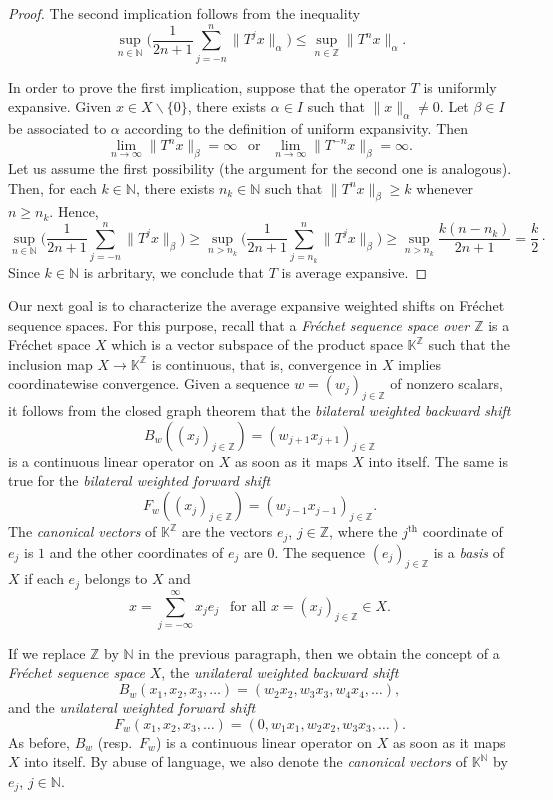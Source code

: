 \documentclass[12pt]{amsart}
\theoremstyle{theorem}
\theoremstyle{definition}
\theoremstyle{remark} \theoremstyle{question} \theoremstyle{example}
\newcommand{\N}{\mathbb{N}}   %
\newcommand{\Z}{\mathbb{Z}}   %
\newcommand{\K}{\mathbb{K}}   %
\begin{document}
\begin{proof}
The second implication follows from the inequality
\[
\sup_{n \in \N} \Big(\frac{1}{2n+1} \sum_{j=-n}^n \|T^j x\|_\alpha \Big) \leq \sup_{n \in \Z} \|T^nx\|_\alpha.
\]

In order to prove the first implication, suppose that the operator $T$ is uniformly expansive. 
Given $x \in X \backslash \{0\}$, there exists $\alpha \in I$ such that $\|x\|_\alpha \neq 0$.
Let $\beta \in I$ be associated to $\alpha$ according to the definition of uniform expansivity. Then
\[
\lim_{n \to \infty} \|T^n x\|_\beta = \infty \ \ \text{ or } \ \ \lim_{n \to \infty} \|T^{-n}x\|_\beta = \infty.
\]
Let us assume the first possibility (the argument for the second one is analogous). 
Then, for each $k \in \N$, there exists $n_k \in \N$ such that $\|T^n x\|_\beta \geq k$ whenever $n \geq n_k$. Hence,
\[
\sup_{n \in \N} \Big( \frac{1}{2n+1} \sum_{j=-n}^n \|T^j x\|_\beta \Big)
\geq \sup_{n > n_k} \Big(\frac{1}{2n+1} \sum_{j=n_k}^n \|T^j x\|_\beta \Big)
\geq \sup_{n > n_k} \frac{k(n-n_k)}{2n+1}
= \frac{k}{2}\cdot
\]
Since $k \in \N$ is arbritary, we conclude that $T$ is average expansive.
\end{proof}

Our next goal is to characterize the average expansive weighted shifts on Fr\'echet sequence spaces. For this purpose,
recall that a {\em Fr\'echet sequence space over $\Z$} is a Fr\'echet space $X$ which is a vector subspace of the product space 
$\K^\Z$ such that the inclusion map $X \to \K^\Z$ is continuous, that is, convergence in $X$ implies coordinatewise convergence.
Given a sequence $w = (w_j)_{j \in \Z}$ of nonzero scalars, it follows from the closed graph theorem that
the {\em bilateral weighted backward shift}
\[
B_w((x_j)_{j \in \Z}) = (w_{j+1}x_{j+1})_{j \in \Z}
\]
is a continuous linear operator on $X$ as soon as it maps $X$ into itself.
The same is true for the {\em bilateral weighted forward shift}
\[
F_w((x_j)_{j \in \Z}) = (w_{j-1}x_{j-1})_{j \in \Z}.
\]
The {\em canonical vectors} of $\K^\Z$ are the vectors $e_j$, $j \in \Z$, where the $j^\text{th}$ coordinate of $e_j$ is $1$
and the other coordinates of $e_j$ are $0$.
The sequence $(e_j)_{j \in \Z}$ is a {\em basis} of $X$ if each $e_j$ belongs to $X$ and
\[
x = \sum_{j=-\infty}^\infty x_j e_j \ \ \text{ for all } x = (x_j)_{j \in \Z} \in X.
\]

If we replace $\Z$ by $\N$ in the previous paragraph, then we obtain the concept of a {\em Fr\'echet sequence space} $X$,
the {\em unilateral weighted backward shift}
\[
B_w(x_1,x_2,x_3,\ldots) = (w_2x_2,w_3x_3,w_4x_4,\ldots),
\]
and the {\em unilateral weighted forward shift}
\[
F_w(x_1,x_2,x_3,\ldots) = (0,w_1x_1,w_2x_2,w_3x_3,\ldots).
\]
As before, $B_w$ (resp.\ $F_w$) is a continuous linear operator on $X$ as soon as it maps $X$ into itself.
By abuse of language, we also denote the {\em canonical vectors} of $\K^\N$ by $e_j$, $j \in \N$.
\end{document}
